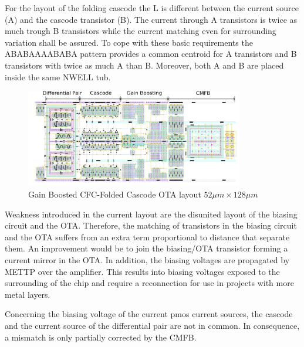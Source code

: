 For the layout of the folding cascode the L is different between the current source (A) and the cascode transistor (B). The current through A transistors is twice as much trough B transistors while the current matching even for surrounding variation shall be assured. To cope with these basic requirements the ABABAAAABABA pattern provides a common centroid for A transistors and B transistors with twice as much A than B. Moreover, both A and B are placed inside the same NWELL tub.

\begin{figure}[htp]
    \centering
    \includegraphics[width=0.85\textwidth]{Chapter7/Figs/layout_ota_v2.png}
    \caption{Gain Boosted CFC-Folded Cascode OTA layout \(52 \mu m \times 128 \mu m\)}
    \label{fig:Gain-Boosted-CFC-Folded-Cascode-OTA-layout}
\end{figure}

Weakness introduced in the current layout are the disunited layout of the biasing circuit and the OTA\@. Therefore, the matching of transistors in the biasing circuit and the OTA suffers from an extra term proportional to distance that separate them. An improvement would be to join the biasing/OTA transistor forming a current mirror in the OTA\@. In addition, the biasing voltages are propagated by METTP over the amplifier. This results into biasing voltages exposed to the surrounding of the chip and require a reconnection for use in projects with more metal layers.

Concerning the biasing voltage of the current pmos current sources, the cascode and the current source of the differential pair are not in common. In consequence, a mismatch is only partially corrected by the CMFB\@.

